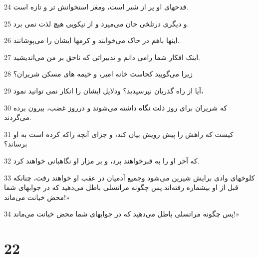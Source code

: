 \par 24 قدحهای او پر از شیر است، ومغز استخوانش تر و تازه است.
\par 25 و دیگری درتلخی جان می‌میرد و از نیکویی هیچ لذت نمی برد.
\par 26 اینها باهم در خاک می‌خوابند و کرمها ایشان را می‌پوشانند.
\par 27 اینک افکار شما رامی دانم و تدبیراتی که ناحق بر من می‌اندیشید.
\par 28 زیرا می‌گویید کجاست خانه امیر، و خیمه های مسکن شریران؟
\par 29 آیا از راه گذریان نپرسیدید؟ ودلایل ایشان را انکار نمی توانید نمود،
\par 30 که شریران برای روز ذلت نگاه داشته می‌شوند و درروز غضب، بیرون برده می‌گردند.
\par 31 کیست که راهش را پیش رویش بیان کند، و جزای آنچه راکه کرده است به او برساند؟
\par 32 که آخر او را به قبرخواهند برد، و بر مزار او نگاهبانی خواهند کرد.
\par 33 کلوخهای وادی برایش شیرین می‌شود وجمیع آدمیان در عقب او خواهند رفت، چنانکه قبل از او بیشماره رفته‌اند.پس چگونه مراتسلی باطل می‌دهید که در جوابهای شما محض خیانت می‌ماند!»
\par 34 پس چگونه مراتسلی باطل می‌دهید که در جوابهای شما محض خیانت می‌ماند!»
 
\chapter{22}

